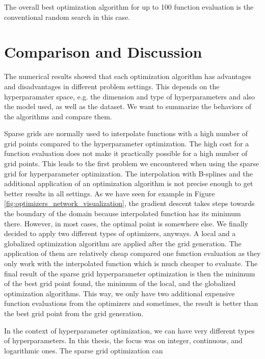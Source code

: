 The overall best optimization algorithm for up to 100 function evaluation is the conventional random search in this case. 

\section{Comparison and Discussion}

The numerical results showed that each optimization algorithm has advantages and disadvantages in different problem settings. This depends on the hyperparamater space, e.g. the dimension and type of hyperparameters and also the model used, as well as the dataset. We want to summarize the behaviors of the algorithms and compare them. \newline 

Sparse grids are normally used to interpolate functions with a high number of grid points compared to the hyperparameter optimization. The high cost for a function evaluation does not make it practically possible for a high number of grid points. This leads to the first problem we encountered when using the sparse grid for hyperparameter optimization. The interpolation with B-splines and the additional application of an optimization algorithm is not precise enough to get better results in all settings. As we have seen for example in Figure \ref{fig:optimizers_network_visualization}, the gradient descent takes steps towards the boundary of the domain because interpolated function has its minimum there. However, in most cases, the optimal point is somewhere else. We finally decided to apply two different types of optimizers, anyways. A local and a globalized optimization algorithm are applied after the grid generation. The application of them are relatively cheap compared one function evaluation as they only work with the interpolated function which is much cheaper to evaluate. The final result of the sparse grid hyperparameter optimization is then the minimum of the best grid point found, the minimum of the local, and the globalized optimization algorithms. This way, we only have two additional expensive function evaluations from the optimizers and sometimes, the result is better than the best grid point from the grid generation.

In the context of hyperparameter optimization, we can have very different types of hyperparameters. In this thesis, the focus was on integer, continuous, and logarithmic ones. The sparse grid optimization can 






